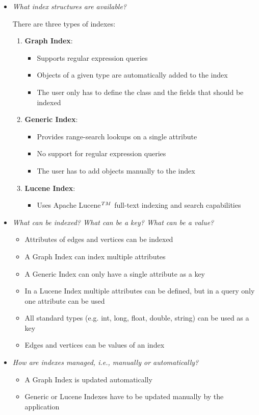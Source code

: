 
\begin{itemize}
\item \emph{What index structures are available?}
	
	There are three types of indexes:
	\begin{enumerate}
		\item \textbf{Graph Index}:
			\begin{itemize}
				\item Supports regular expression queries
				\item Objects of a given type are automatically added to the index
				\item The user only has to define the class and the fields that should be indexed
			\end{itemize}
		\item \textbf{Generic Index}:
			\begin{itemize}
				\item Provides range-search lookups on a single attribute
				\item No support for regular expression queries
				\item The user has to add objects manually to the index
			\end{itemize}
		\item \textbf{Lucene Index}:
			\begin{itemize}
				\item Uses Apache Lucene$^{\tiny{TM}}$ full-text indexing and search capabilities
			\end{itemize}
	\end{enumerate}
\item \emph{What can be indexed? What can be a key? What can be a value?}
	\begin{itemize}
		\item Attributes of edges and vertices can be indexed
		\item A Graph Index can index multiple attributes
		\item A Generic Index can only have a single attribute as a key
		\item In a Lucene Index multiple attributes can be defined, but in a query only one attribute can be used 
		\item All standard types (e.g. int, long, float, double, string) can be used as a key
		\item Edges and vertices can be values of an index
	\end{itemize}
\item \emph{How are indexes managed, i.e., manually or automatically?}
	\begin{itemize}
		\item A Graph Index is updated automatically
		\item Generic or Lucene Indexes have to be updated manually by the application 
	\end{itemize}
\end{itemize}
